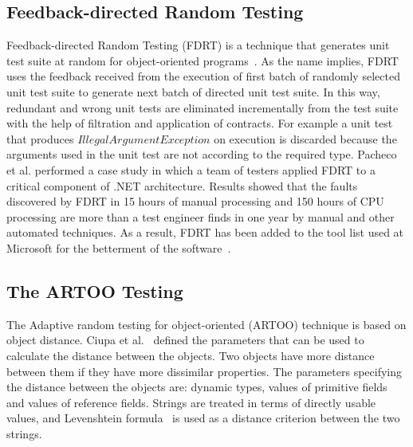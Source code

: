 
\subsection{Feedback-directed Random Testing}
Feedback-directed Random Testing (FDRT) is a technique that generates unit test suite at random for object-oriented programs~\cite{pacheco2007randoop}. As the name implies, FDRT uses the feedback received from the execution of first batch of randomly selected unit test suite to generate next batch of directed unit test suite. In this way, redundant  and wrong unit tests are eliminated incrementally from the test suite with the help of filtration and application of contracts. For example a unit test that produces $IllegalArgumentException$ on execution is discarded because the arguments used in the unit test are not according to the required type. Pacheco et al. performed a case study in which a team of testers applied FDRT to a critical component of .NET architecture. Results showed that the faults discovered by FDRT in 15 hours of manual processing and 150 hours of CPU processing are more than a test engineer finds in one year by manual and other automated techniques. As a result, FDRT has been added to the tool list used at Microsoft for the betterment of the software~\cite{pacheco2008finding}. 



\subsection{The ARTOO Testing}
The Adaptive random testing for object-oriented (ARTOO) technique is based on object distance. Ciupa et al.~\cite{ciupa2006object} defined the parameters that can be used to calculate the distance between the objects. Two objects have more distance between them if they have more dissimilar properties. The parameters specifying the distance between the objects are: dynamic types, values of primitive fields and values of reference fields. Strings are treated in terms of directly usable values, and Levenshtein formula~\cite{levenshtein1966binary} is used as a distance criterion between the two strings.


